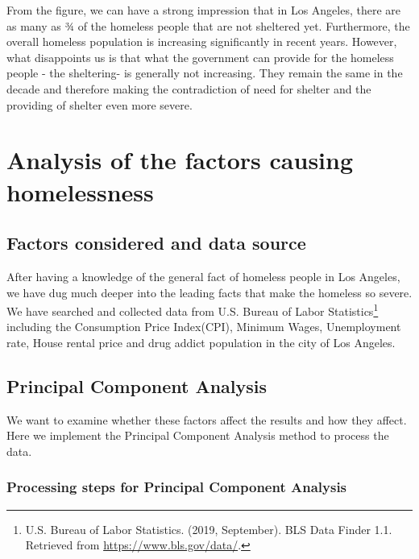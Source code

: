 \documentclass[]{article}
\let\rmarkdownfootnote\footnote%
\def\footnote{\protect\rmarkdownfootnote}
\begin{document}
From the figure, we can have a strong impression that in Los Angeles,
there are as many as ¾ of the homeless people that are not sheltered
yet. Furthermore, the overall homeless population is increasing
significantly in recent years. However, what disappoints us is that what
the government can provide for the homeless people - the sheltering- is
generally not increasing. They remain the same in the decade and
therefore making the contradiction of need for shelter and the providing
of shelter even more severe.

\hypertarget{analysis-of-the-factors-causing-homelessness}{%
\section{Analysis of the factors causing
homelessness}\label{analysis-of-the-factors-causing-homelessness}}

\hypertarget{factors-considered-and-data-source}{%
\subsection{Factors considered and data
source}\label{factors-considered-and-data-source}}

After having a knowledge of the general fact of homeless people in Los
Angeles, we have dug much deeper into the leading facts that make the
homeless so severe. We have searched and collected data from U.S. Bureau
of Labor Statistics\footnote{U.S. Bureau of Labor Statistics. (2019,
  September). BLS Data Finder 1.1. Retrieved from
  \url{https://www.bls.gov/data/}.} including the Consumption Price
Index(CPI), Minimum Wages, Unemployment rate, House rental price and
drug addict population in the city of Los Angeles.

\hypertarget{principal-component-analysis}{%
\subsection{Principal Component
Analysis}\label{principal-component-analysis}}

We want to examine whether these factors affect the results and how they
affect. Here we implement the Principal Component Analysis method to
process the data.

\hypertarget{processing-steps-for-principal-component-analysis}{%
\subsubsection{Processing steps for Principal Component
Analysis}\label{processing-steps-for-principal-component-analysis}}
\end{document}
